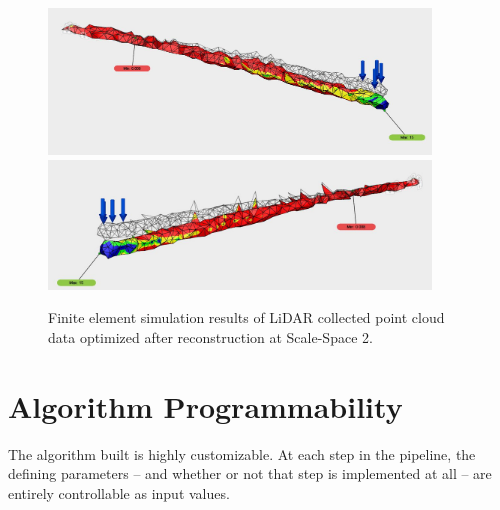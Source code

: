 \documentclass[12pt]{drexelthesis}
\let\Oldsection\section
\renewcommand{\section}{\FloatBarrier\Oldsection}
\begin{document}
\begin{figure}[!ht]
	\centering
		\includegraphics[width=4in]{conclusion/realSS2FEresult.jpg}
		\includegraphics[width=4in]{conclusion/realSS2FEresult01.jpg}
		\caption[Finite element simulation of LiDAR collected point cloud data]{\centering Finite element simulation results of LiDAR collected point cloud data optimized after reconstruction at Scale-Space 2.}
\end{figure}



\section{ Algorithm Programmability }

The algorithm built is highly customizable. At each step in the pipeline, the defining parameters -- and whether or not that step is implemented at all -- are entirely controllable as input values.
\end{document}

